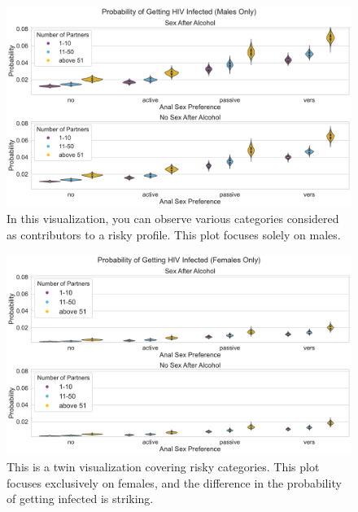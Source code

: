 \documentclass[
  12pt,
  letterpaper,
  DIV=11,
  numbers=noendperiod]{scrartcl}
\begin{document}
\begin{figure}

{\centering \includegraphics{HIVPaper_files/figure-latex/fig-violinbigmales-output-1.pdf}

}

\caption{\label{fig-violinbigmales}In this visualization, you can
observe various categories considered as contributors to a risky
profile. This plot focuses solely on males.}

\end{figure}

\begin{figure}

{\centering \includegraphics{HIVPaper_files/figure-latex/fig-violinbigfemales-output-1.pdf}

}

\caption{\label{fig-violinbigfemales}This is a twin visualization
covering risky categories. This plot focuses exclusively on females, and
the difference in the probability of getting infected is striking.}

\end{figure}
\end{document}
